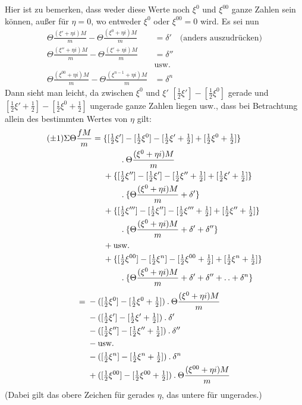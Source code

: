 Hier ist zu bemerken, dass weder diese Werte noch $\xi^0$ und $\xi^{00}$ ganze Zahlen sein können, außer für $\eta=0$, wo entweder $\xi^0$ oder $\xi^{00}=0$ wird. Es sei nun
\[
\begin{aligned}
\Theta\frac{(\xi'+\eta i)M}{m}-\Theta\frac{(\xi^0+\eta i)M}{m}&=\delta'\quad\text{(anders auszudrücken)}\\
\Theta\frac{(\xi''+\eta i)M}{m}-\Theta\frac{(\xi'+\eta i)M}{m}&=\delta''\\
&\text{usw.}\\
\Theta\frac{(\xi^{00}+\eta i)M}{m}-\Theta\frac{(\xi^{n-1}+\eta i)M}{m}&=\delta^n
\end{aligned}
\]
Dann sieht man leicht, da zwischen $\xi^0$ und $\xi'$ $[\frac12\xi']-[\frac12\xi^0]$ gerade und $[\frac12\xi'+\frac12]-[\frac12\xi^0+\frac12]$ ungerade ganze Zahlen liegen usw., dass bei Betrachtung allein des bestimmten Wertes von $\eta$ gilt:
\[
\begin{aligned}
(\pm1)\Sigma\Theta\frac{fM}{m}
={}&\{[\tfrac12\xi']-[\tfrac12\xi^0]-[\tfrac12\xi'+\tfrac12]+[\tfrac12\xi^0+\tfrac12]\}\\
&\qquad\mathbin{.}\Theta\frac{(\xi^0+\eta i)M}{m}\\
&+\{[\tfrac12\xi'']-[\tfrac12\xi']-[\tfrac12\xi''+\tfrac12]+[\tfrac12\xi'+\tfrac12]\}\\
&\qquad\mathbin{.}\{\Theta\frac{(\xi^0+\eta i)M}{m}+\delta'\}\\
&+\{[\tfrac12\xi''']-[\tfrac12\xi'']-[\tfrac12\xi'''+\tfrac12]+[\tfrac12\xi''+\tfrac12]\}\\
&\qquad\mathbin{.}\{\Theta\frac{(\xi^0+\eta i)M}{m}+\delta'+\delta''\}\\
&+\text{usw.}\\
&+\{[\tfrac12\xi^{00}]-[\tfrac12\xi^n]-[\tfrac12\xi^{00}+\tfrac12]+[\tfrac12\xi^n+\tfrac12]\}\\
&\qquad\mathbin{.}\{\Theta\frac{(\xi^0+\eta i)M}{m}+\delta'+\delta''+\mathinner{.\,.}+\delta^n\}
\end{aligned}
\]
\[
\begin{aligned}
={}&-([\tfrac12\xi^0]-[\tfrac12\xi^0+\tfrac12])\mathbin{.}\Theta\frac{(\xi^0+\eta i)M}{m}\\
&-([\tfrac12\xi']-[\tfrac12\xi'+\tfrac12])\mathbin{.}\delta'\\
&-([\tfrac12\xi'']-[\tfrac12\xi''+\tfrac12])\mathbin{.}\delta''\\
&-\text{usw.}\\
&-([\tfrac12\xi^n]-[\tfrac12\xi^n+\tfrac12])\mathbin{.}\delta^n\\
&+([\tfrac12\xi^{00}]-[\tfrac12\xi^{00}+\tfrac12])\mathbin{.}\Theta\frac{(\xi^{00}+\eta i)M}{m}
\end{aligned}
\]
(Dabei gilt das obere Zeichen für gerades $\eta$, das untere für ungerades.)

